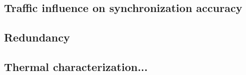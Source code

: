 \subsection{Traffic influence on synchronization accuracy}


\subsection{Redundancy}


\subsection{Thermal characterization...}


 
